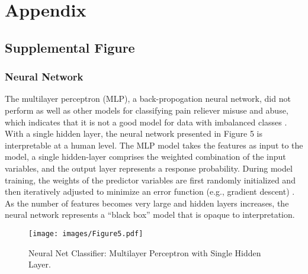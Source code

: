 \documentclass[sigconf]{acmart}
\begin{document}
\section{Appendix}

\subsection{Supplemental Figure}

\subsubsection{Neural Network} The multilayer perceptron (MLP), a 
back-propogation neural network, did not perform as well as other models 
for classifying pain reliever misuse and abuse, which indicates that it is 
not a good model for data with imbalanced classes \cite{yun09}. 
With a single hidden layer, the neural network presented in Figure 5 is 
interpretable at a human level. The MLP model  takes the features as input
to the model, a single hidden-layer comprises the weighted combination of
the input variables, and the output layer represents a response probability. 
During model training, the weights of the predictor variables are first 
randomly initialized and then iteratively adjusted to minimize an error 
function (e.g., gradient descent) \cite{brown12}. As the number of features
becomes very large and hidden layers increases, the neural network 
represents a ``black box'' model that is opaque to interpretation. 

\begin{figure}[!ht]
  \centering\texttt{[image: images/Figure5.pdf]}
  \caption{Neural Net Classifier: Multilayer Perceptron with Single Hidden Layer.}
  \label{f:Figure5}
\end{figure}
\end{document}
